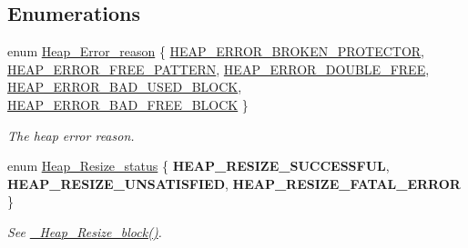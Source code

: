 \subsection*{Enumerations}
\begin{DoxyCompactItemize}
\item 
enum \mbox{\hyperlink{group__RTEMSScoreHeap_ga9f62692d135584572333cc6d1759e5e4}{Heap\+\_\+\+Error\+\_\+reason}} \{ \newline
\mbox{\hyperlink{group__RTEMSScoreHeap_gga9f62692d135584572333cc6d1759e5e4ac63d3bd4d7901840f92555406bf0c98f}{H\+E\+A\+P\+\_\+\+E\+R\+R\+O\+R\+\_\+\+B\+R\+O\+K\+E\+N\+\_\+\+P\+R\+O\+T\+E\+C\+T\+OR}}, 
\mbox{\hyperlink{group__RTEMSScoreHeap_gga9f62692d135584572333cc6d1759e5e4afb6094258c33a4c129972f5b7295bbaf}{H\+E\+A\+P\+\_\+\+E\+R\+R\+O\+R\+\_\+\+F\+R\+E\+E\+\_\+\+P\+A\+T\+T\+E\+RN}}, 
\mbox{\hyperlink{group__RTEMSScoreHeap_gga9f62692d135584572333cc6d1759e5e4ae79a312b7fc1f5e0ee8c31a7f85c1e0a}{H\+E\+A\+P\+\_\+\+E\+R\+R\+O\+R\+\_\+\+D\+O\+U\+B\+L\+E\+\_\+\+F\+R\+EE}}, 
\mbox{\hyperlink{group__RTEMSScoreHeap_gga9f62692d135584572333cc6d1759e5e4a27e8fabd5846f9b48df3a6e31484a142}{H\+E\+A\+P\+\_\+\+E\+R\+R\+O\+R\+\_\+\+B\+A\+D\+\_\+\+U\+S\+E\+D\+\_\+\+B\+L\+O\+CK}}, 
\newline
\mbox{\hyperlink{group__RTEMSScoreHeap_gga9f62692d135584572333cc6d1759e5e4aed114f40b13a7bc4ac394bdd017e667d}{H\+E\+A\+P\+\_\+\+E\+R\+R\+O\+R\+\_\+\+B\+A\+D\+\_\+\+F\+R\+E\+E\+\_\+\+B\+L\+O\+CK}}
 \}
\begin{DoxyCompactList}\small\item\em The heap error reason. \end{DoxyCompactList}\item 
\mbox{\label{group__RTEMSScoreHeap_gac2cffc99d60d783b92e79fd412d1cbdc}} 
enum \mbox{\hyperlink{group__RTEMSScoreHeap_gac2cffc99d60d783b92e79fd412d1cbdc}{Heap\+\_\+\+Resize\+\_\+status}} \{ {\bfseries H\+E\+A\+P\+\_\+\+R\+E\+S\+I\+Z\+E\+\_\+\+S\+U\+C\+C\+E\+S\+S\+F\+UL}, 
{\bfseries H\+E\+A\+P\+\_\+\+R\+E\+S\+I\+Z\+E\+\_\+\+U\+N\+S\+A\+T\+I\+S\+F\+I\+ED}, 
{\bfseries H\+E\+A\+P\+\_\+\+R\+E\+S\+I\+Z\+E\+\_\+\+F\+A\+T\+A\+L\+\_\+\+E\+R\+R\+OR}
 \}
\begin{DoxyCompactList}\small\item\em See \mbox{\hyperlink{group__RTEMSScoreHeap_ga89495f3d0b1206d098d2733d37c1610e}{\+\_\+\+Heap\+\_\+\+Resize\+\_\+block()}}. \end{DoxyCompactList}\end{DoxyCompactItemize}
